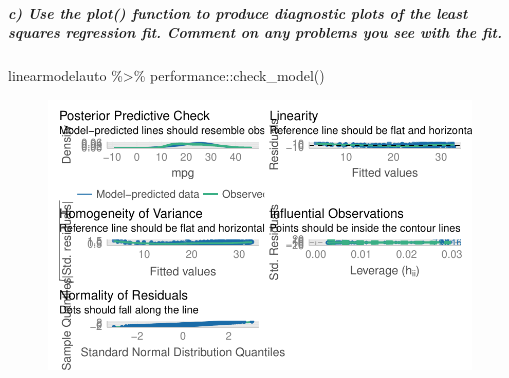 \documentclass[
  letterpaper,
  DIV=11,
  numbers=noendperiod]{scrartcl}
\let\oldsubparagraph\subparagraph
\renewcommand{\subparagraph}[1]{\oldsubparagraph{#1}\mbox{}}
\newenvironment{Shaded}{\begin{snugshade}}{\end{snugshade}}
\newcommand{\FunctionTok}[1]{\textcolor[rgb]{0.28,0.35,0.67}{#1}}
\newcommand{\NormalTok}[1]{\textcolor[rgb]{0.00,0.23,0.31}{#1}}
\newcommand{\SpecialCharTok}[1]{\textcolor[rgb]{0.37,0.37,0.37}{#1}}
\begin{document}
\hypertarget{c-use-the-plot-function-to-produce-diagnostic-plots-of-the-least-squares-regression-fit.-comment-on-any-problems-you-see-with-the-fit.}{%
\subparagraph{c) Use the plot() function to produce diagnostic plots of
the least squares regression fit. Comment on any problems you see with
the
fit.}\label{c-use-the-plot-function-to-produce-diagnostic-plots-of-the-least-squares-regression-fit.-comment-on-any-problems-you-see-with-the-fit.}}

\begin{Shaded}
\begin{Highlighting}[]
\NormalTok{linearmodelauto }\SpecialCharTok{\%\textgreater{}\%}\NormalTok{ performance}\SpecialCharTok{::}\FunctionTok{check\_model}\NormalTok{()}
\end{Highlighting}
\end{Shaded}

\begin{figure}[H]

{\centering \includegraphics{HW-9-Linear-Regression_files/figure-pdf/unnamed-chunk-7-1.pdf}

}

\end{figure}

\hypertarget{section-1}{%
\subparagraph{~}\label{section-1}}
\end{document}
